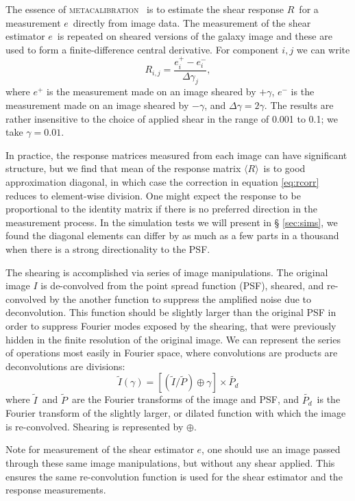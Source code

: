 \documentclass[iop]{emulateapj}
\newcommand{\vest}{\mbox{\boldmath $e$}}
\newcommand{\est}{e}
\newcommand{\mcal}{\textsc{metacalibration}}
\newcommand{\mcalR}{\mbox{\boldmath $R$}}
\newcommand{\mcalRmean}{\mbox{\boldmath $\langle R \rangle$}}
\newcommand{\Itild}{\mbox{$\widetilde{I}$}}
\newcommand{\Ptil}{\mbox{$\widetilde{P}$}}
\newcommand{\Ptild}{\mbox{$\widetilde{P_d}$}}
\begin{document}
The essence of \mcal\ \citep{HuffMcal} is to estimate the shear response
\mcalR\ for a measurement \vest\ directly from image data.  The measurement of
the shear estimator \vest\ is repeated on sheared versions of the galaxy
image and these are used to form a finite-difference central derivative.
For component $i,j$ we can write
\begin{equation} \label{eq:Rnum}
    R_{i,j} = \frac{\est_i^+ - \est_i^-}{\Delta \gamma_j},
\end{equation}
where $\est^+$ is the measurement made on an image sheared by $+\gamma$,
$\est^-$ is the measurement made on an image sheared by $-\gamma$,
and $\Delta \gamma = 2\gamma$.  The results are rather insensitive
to the choice of applied shear in the range of 0.001 to 0.1;
we take $\gamma=0.01$.

In practice, the response matrices measured from each image can have
significant structure, but we find that mean of the response matrix \mcalRmean\
is to good approximation diagonal,  in which case the correction in equation
\ref{eq:rcorr} reduces to element-wise division.  One might expect the response
to be proportional to the identity matrix if there is no preferred direction in
the measurement process.  In the simulation tests we will present in \S
\ref{sec:sims}, we found the diagonal elements can differ by as much as a few
parts in a thousand when there is a strong directionality to the PSF.


The shearing is accomplished via series of image manipulations. The original
image $I$ is de-convolved from the point spread function (PSF), sheared, and
re-convolved by the another function to suppress the amplified noise due to
deconvolution.  This function should be slightly larger than the original PSF
in order to suppress Fourier modes exposed by the shearing, that were
previously hidden in the finite resolution of the original image.  We can
represent the series of operations most easily in Fourier space, where
convolutions are products are deconvolutions are divisions:
\begin{equation}
    \Itild(\gamma) = \left[ \left( \Itild/\Ptil \right) \oplus \gamma \right] \times \Ptild
\end{equation}
where \Itild\ and \Ptil\ are the Fourier transforms of the image and PSF, and
\Ptild\ is the Fourier transform of the slightly larger, or dilated function
with which the image is re-convolved.  Shearing is represented by $\oplus$.

Note for measurement of the shear estimator \vest, one should use an image
passed through these same image manipulations, but without any shear applied.
This ensures the same re-convolution function is used for the shear estimator
and the response measurements.
\end{document}

